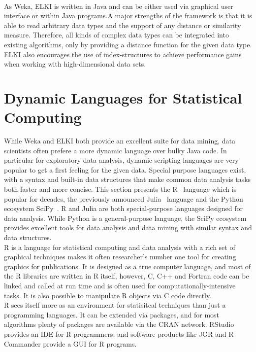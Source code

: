\\
As Weka, ELKI is written in Java and can be either used via graphical user interface or within Java programs.A major strengths of the framework is that it is able to read arbitrary data types and the support of any distance or similarity measure. Therefore, all kinds of complex data types can be integrated into existing algorithms, only by providing a distance function for the given data type. ELKI also encourages the use of index-structures to achieve performance gains when working with high-dimensional data sets. 


\section{Dynamic Languages for Statistical Computing}

While Weka and ELKI both provide an excellent suite for data mining, data scientists often prefere a more dynamic language over bulky Java code. In particular for exploratory data analysis, dynamic scripting languages are very popular to get a first feeling for the given data. Special purpose languages exist, with a syntax and built-in data structures that make common data analysis tasks both faster and more concise. This section presents the R~\parencite{} language which is popular for decades, the previously announced Julia~\parencite{} language and the Python ecosystem SciPy~\parencite{}. R and Julia are both special-purpose languages designed for data analysis. While Python is a general-purpose language, the SciPy ecosystem provides excellent tools for data analysis and data mining with similar syntax and data structures.
\\
R is a language for statistical computing and data analysis with a rich set of graphical techniques makes it often researcher's number one tool for creating graphics for publications. It is designed as a true computer language, and most of the R libraries are written in R itself, however, C, C++ and Fortran code can be linked and called at run time and is often used for computationally-intensive tasks. It is also possible to manipulate R objects via C code directly.
\\
R sees itself more as an environment for statisitcal techniques than just a programming languages. It can be extended via packages, and for most algorithms plenty of packages are available via the CRAN network. RStudio provides an IDE for R programmers, and software products like JGR and R Commander provide a GUI for R programs.
\\
